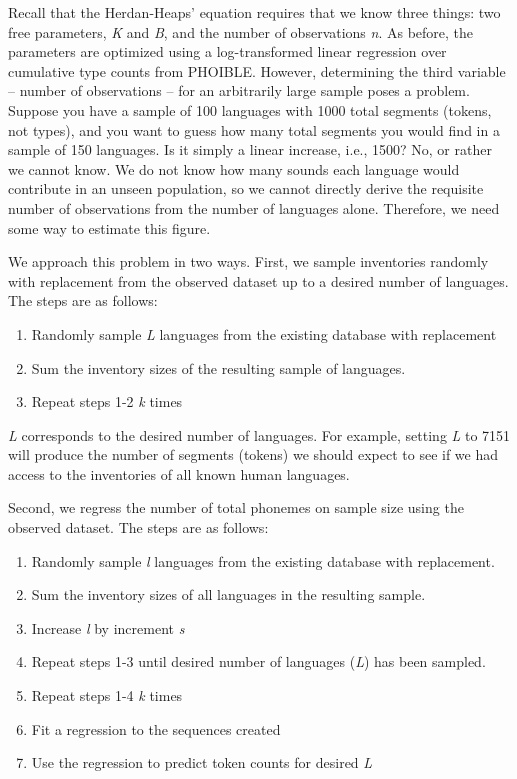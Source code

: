 \documentclass[
]{article}
\providecommand{\tightlist}{%
  \setlength{\itemsep}{0pt}\setlength{\parskip}{0pt}}
\begin{document}
Recall that the Herdan-Heaps' equation requires that we know three
things: two free parameters, \emph{K} and \emph{B}, and the number of
observations \emph{n}. As before, the parameters are optimized using a
log-transformed linear regression over cumulative type counts from
PHOIBLE. However, determining the third variable -- number of
observations -- for an arbitrarily large sample poses a problem. Suppose
you have a sample of 100 languages with 1000 total segments (tokens, not
types), and you want to guess how many total segments you would find in
a sample of 150 languages. Is it simply a linear increase, i.e., 1500?
No, or rather we cannot know. We do not know how many sounds each
language would contribute in an unseen population, so we cannot directly
derive the requisite number of observations from the number of languages
alone. Therefore, we need some way to estimate this figure.

We approach this problem in two ways. First, we sample inventories
randomly with replacement from the observed dataset up to a desired
number of languages. The steps are as follows:

\begin{enumerate}
\def\labelenumi{\arabic{enumi}.}
\tightlist
\item
  Randomly sample \emph{L} languages from the existing database with
  replacement
\item
  Sum the inventory sizes of the resulting sample of languages.
\item
  Repeat steps 1-2 \emph{k} times
\end{enumerate}

\emph{L} corresponds to the desired number of languages. For example,
setting \emph{L} to 7151 will produce the number of segments (tokens) we
should expect to see if we had access to the inventories of all known
human languages.

Second, we regress the number of total phonemes on sample size using the
observed dataset. The steps are as follows:

\begin{enumerate}
\def\labelenumi{\arabic{enumi}.}
\tightlist
\item
  Randomly sample \emph{l} languages from the existing database with
  replacement.
\item
  Sum the inventory sizes of all languages in the resulting sample.
\item
  Increase \emph{l} by increment \emph{s}
\item
  Repeat steps 1-3 until desired number of languages (\emph{L}) has been
  sampled.
\item
  Repeat steps 1-4 \emph{k} times
\item
  Fit a regression to the sequences created
\item
  Use the regression to predict token counts for desired \emph{L}
\end{enumerate}
\end{document}
